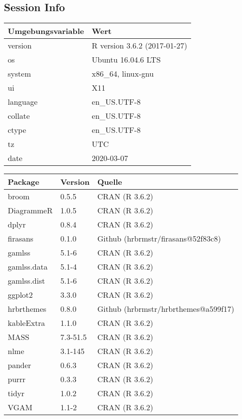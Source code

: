 \documentclass[ngerman,a4paper,]{scrartcl}
\theoremstyle{definition}
\theoremstyle{definition}
\theoremstyle{definition}
\theoremstyle{remark}
\begin{document}
\hypertarget{session-info}{%
\subsection{Session Info}\label{session-info}}

\begin{table}[H]
\centering
\begin{tabular}{ll}
\toprule
Umgebungsvariable & Wert\\
\midrule
version & R version 3.6.2 (2017-01-27)\\
os & Ubuntu 16.04.6 LTS\\
system & x86\_64, linux-gnu\\
ui & X11\\
language & en\_US.UTF-8\\
collate & en\_US.UTF-8\\
ctype & en\_US.UTF-8\\
tz & UTC\\
date & 2020-03-07\\
\bottomrule
\end{tabular}
\end{table}

\begin{table}[H]
\centering
\begin{tabular}{lll}
\toprule
Package & Version & Quelle\\
\midrule
broom & 0.5.5 & CRAN (R 3.6.2)\\
DiagrammeR & 1.0.5 & CRAN (R 3.6.2)\\
dplyr & 0.8.4 & CRAN (R 3.6.2)\\
firasans & 0.1.0 & Github (hrbrmstr/firasans@52f83c8)\\
gamlss & 5.1-6 & CRAN (R 3.6.2)\\
gamlss.data & 5.1-4 & CRAN (R 3.6.2)\\
gamlss.dist & 5.1-6 & CRAN (R 3.6.2)\\
ggplot2 & 3.3.0 & CRAN (R 3.6.2)\\
hrbrthemes & 0.8.0 & Github (hrbrmstr/hrbrthemes@a599f17)\\
kableExtra & 1.1.0 & CRAN (R 3.6.2)\\
MASS & 7.3-51.5 & CRAN (R 3.6.2)\\
nlme & 3.1-145 & CRAN (R 3.6.2)\\
pander & 0.6.3 & CRAN (R 3.6.2)\\
purrr & 0.3.3 & CRAN (R 3.6.2)\\
tidyr & 1.0.2 & CRAN (R 3.6.2)\\
VGAM & 1.1-2 & CRAN (R 3.6.2)\\
\bottomrule
\end{tabular}
\end{table}
\end{document}
